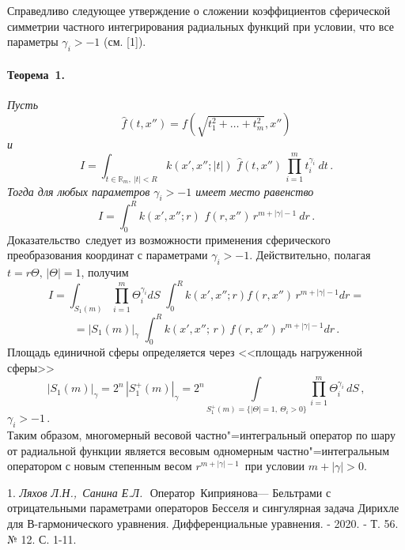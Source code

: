 Справедливо следующее утверждение о сложении коэффициентов сферической симметрии частного интегрирования радиальных функций при условии, что все параметры $\gamma_i>-1$ (см. [1]).

\paragraph{Теорема~1.} {\it Пусть
$$
\widehat{f}(t,x'')=f\left(\sqrt{t_{1}^{2}+\ldots+
t_{m}^2}, x''\right)
$$
и
$$
I=\int_{t\in\mathbb{R}_m,~|t|<R} k(x',x'';|t|)\,\, \widehat{f}(t,x'')\,
\prod_{i=1}^m t_i^{\gamma_i}~ dt\,.
$$
Тогда для любых параметров $\gamma_i>-1$ имеет место равенство
$$
I=\int_0^R k(x',x'';r)\,\, f(r,x'')\,r^{m+|\gamma|-1}~ dr\,.
$$}
Доказательство\, следует из возможности применения сферического преобразования координат с параметрами
$\gamma_i>-1$. Действительно, полагая
$t=r\Theta,\, |\Theta|=1$, получим
$$I= \int_{S_1(m)}\prod_{i=1}^m \Theta_i^{\gamma_i}dS\,\,\int_{0}^{R} k\left(x',x''; r\right)
f\left(r, x''\right)\, r^{m+|\gamma|-1} d r=
$$
$$
=|S_1(m)|_\gamma\,\,\int_{0}^{R} k(x',x'';\, r)\, f(r,\, x'')\, r^{m+|\gamma|-1} d r\,.
$$
Площадь единичной сферы определяется через <<площадь нагруженной сферы>>
\begin{equation*}
|S_1(m)|_\gamma=2^n\,|S^+_1(m)|_\gamma=2^n
\int\limits_{S_1^+(m)=\{|\Theta|=1,~\Theta_i>0\} } \prod_{i=1}^m\Theta_i^{\gamma_i}\,dS\,,
\end{equation*}
$\gamma_i>-1\,.$\\
Таким образом, многомерный весовой частно"=интегральный оператор по шару от радиальной функции является весовым одномерным частно"=интегральным оператором с новым степенным весом $r^{m+|\gamma|-1}$\, при условии $m+|\gamma|>0$.


\litlist

1. {\it Ляхов Л.Н.,\, Санина Е.Л.}\,\,
Оператор\, Киприянова--- Бельтрами с отрицательными параметрами операторов Бесселя и сингулярная задача Дирихле для В-гармонического уравнения. Дифференциальные уравнения. - 2020. - Т. 56. № 12. С. 1-11.
